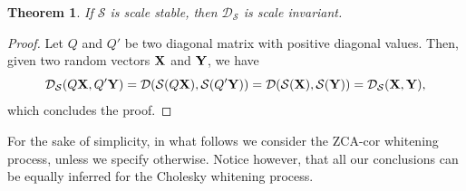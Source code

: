 \documentclass{article}
\def\DDSS{\mathcal{D}_\mathcal{S}}
\def\bX{{\bf X}}
\def\bY{{\bf Y}}
\newtheorem{theorem}{Theorem}
\newtheorem{proof}{Proof}
\begin{document}

\begin{theorem}
    \label{thm:scale_invariance_via_whitening}
    If $\mathcal{S}$ is scale stable, then $\DDSS$ is scale invariant.
\end{theorem}

\begin{proof}
    Let $Q$ and $Q'$ be two diagonal matrix with positive diagonal values.
    Then, given two random vectors $\bX$ and $\bY$, we have
    \[
        \DDSS(Q\bX,Q'\bY)=\mathcal{D}(\mathcal{S}(Q\bX),\mathcal{S}(Q'\bY))=\mathcal{D}(\mathcal{S}(\bX),\mathcal{S}(\bY))=\DDSS(\bX,\bY),
    \]
    which concludes the proof.
\end{proof}


% 
For the sake of simplicity, in what follows we consider the ZCA-cor whitening process, unless we specify otherwise.
% 
Notice however, that all our conclusions can be equally inferred for the Cholesky whitening process.
% 
\end{document}
